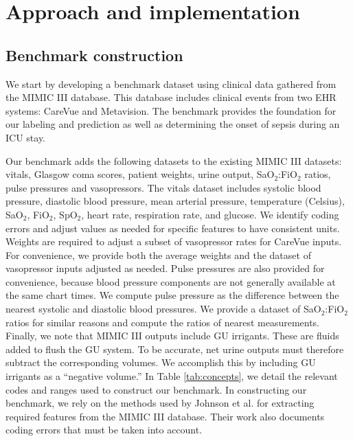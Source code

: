 \documentclass{amia}
\begin{document}
\section{Approach and implementation}
\subsection*{Benchmark construction}
We start by developing a benchmark dataset using clinical data gathered 
from the MIMIC III database.\cite{pollard2016} This database includes clinical events from 
two EHR systems: CareVue and Metavision.  The benchmark provides the
foundation for our labeling and prediction as well as determining the 
onset of sepsis during an ICU stay.  

Our benchmark adds the following datasets to the existing MIMIC III datasets: 
vitals, Glasgow coma scores, patient weights, urine output, SaO$_2$:FiO$_2$ ratios, 
pulse pressures and vasopressors.  The vitals dataset includes systolic blood pressure, 
diastolic blood pressure, mean arterial pressure, 
temperature (Celsius), SaO$_2$, FiO$_2$, SpO$_2$, heart rate, respiration rate, and glucose.  
We identify coding errors and adjust values as needed for specific features to have consistent units.  Weights
are required to adjust a subset of vasopressor rates for CareVue inputs.  For convenience, we provide
both the average weights and the dataset of vasopressor inputs adjusted as needed.  Pulse pressures
are also provided for convenience, because blood pressure components are not generally available at the same
chart times.  We compute pulse pressure as the difference between the nearest systolic and
diastolic blood pressures.  We provide a dataset of SaO$_2$:FiO$_2$ ratios for similar reasons and compute 
the ratios of nearest measurements.  
Finally, we note that MIMIC III outputs include GU irrigants.  These are fluids added to flush the GU system.  
To be accurate, net urine outputs must therefore subtract the corresponding volumes.  We accomplish this by including
GU irrigants as a ``negative volume.'' In Table \ref{tab:concepts}, we detail the relevant codes and ranges 
used to construct our benchmark.  In constructing our benchmark, we rely on the methods used
by Johnson et al. for extracting required features from the MIMIC III database.\cite{johnson2017}
Their work also documents coding errors that must be taken into account.   
\end{document}
